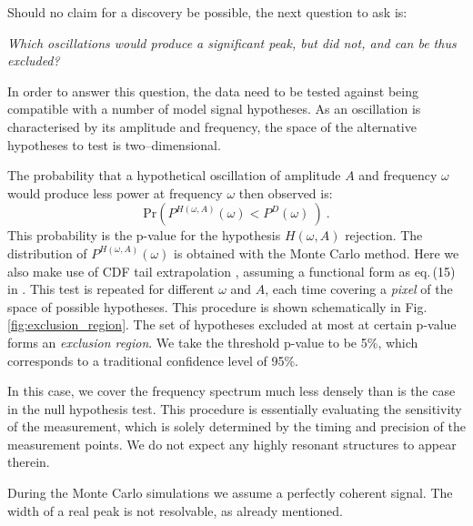 Should no claim for a discovery be possible, the next question to ask is:
\begin{center}
  \emph{Which oscillations would produce a significant peak, but did not, and can be thus excluded?}
\end{center}
In order to answer this question, the data need to be tested against being compatible with a number of model signal hypotheses. As an oscillation is characterised by its amplitude and frequency, the space of the alternative hypotheses to test is two--dimensional.

The probability that a hypothetical oscillation of amplitude $A$ and frequency $\omega$ would produce less power at frequency $\omega$ then observed is:
\begin{equation}
  \mathrm{Pr}\left( P^{H(\omega, A)}(\omega) < P^D(\omega)\ \right) \ .
\end{equation}
This probability is the p-value for the hypothesis $H(\omega, A)$ rejection. The distribution of $P^{H(\omega, A)}(\omega)$ is obtained with the Monte Carlo method. Here we also make use of CDF tail extrapolation , assuming a functional form as eq.\,(15) in \cite{Scargle1982} . This test is repeated for different $\omega$ and $A$, each time covering a \emph{pixel} of the space of possible hypotheses. This procedure is shown schematically in Fig.\,\ref{fig:exclusion_region}. The set of hypotheses excluded at most at certain p-value forms an \emph{exclusion region}. We take the threshold p-value to be 5\%, which corresponds to a traditional confidence level of 95\%.

In this case, we cover the frequency spectrum much less densely than is the case in the null hypothesis test. This procedure is essentially evaluating the sensitivity of the measurement, which is solely determined by the timing and precision of the measurement points. We do not expect any highly resonant structures to appear therein.

During the Monte Carlo simulations we assume a perfectly coherent signal. The width of a real peak is not resolvable, as already mentioned.


